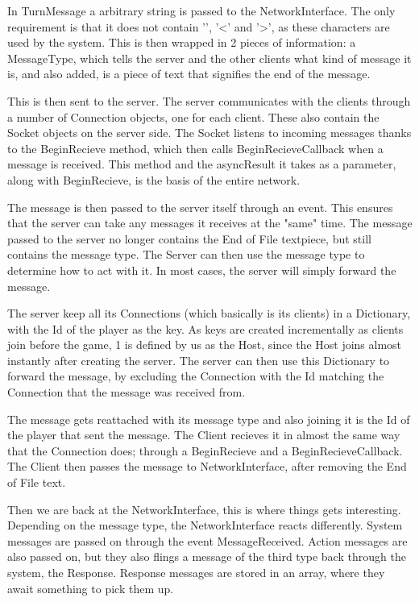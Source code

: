 In TurnMessage a arbitrary string is passed to the NetworkInterface.
The only requirement is that it does not contain '\textbar', '\textless' and '\textgreater', as these characters are used by the system.
This is then wrapped in 2 pieces of information: a MessageType, which tells the server and the other clients what kind of message it is, and also added, is a piece of text that signifies the end of the message.

This is then sent to the server. The server communicates with the clients through a number of Connection objects, one for each client. 
These also contain the Socket objects on the server side. The Socket listens to incoming messages thanks to the BeginRecieve method, which then calls BeginRecieveCallback when a message is received. 
This method and the asyncResult it takes as a parameter, along with BeginRecieve, is the basis of the entire network.

The message is then passed to the server itself through an event.
This ensures that the server can take any messages it receives at the "same" time. 
The message passed to the server no longer contains the End of File textpiece, but still contains the message type.
The Server can then use the message type to determine how to act with it. In most cases, the server will simply forward the message.

The server keep all its Connections (which basically is its clients) in a Dictionary, with the Id of the player as the key. 
As keys are created incrementally as clients join before the game, 1 is defined by us as the Host, since the Host joins almost instantly after creating the server.
The server can then use this Dictionary to forward the message, by excluding the Connection with the Id matching the Connection that the message was received from.

The message gets reattached with its message type and also joining it is the Id of the player that sent the message. 
The Client recieves it in almost the same way that the Connection does; through a BeginRecieve and a BeginRecieveCallback.
The Client then passes the message to NetworkInterface, after removing the End of File text.

Then we are back at the NetworkInterface, this is where things gets interesting. 
Depending on the message type, the NetworkInterface reacts differently.
System messages are passed on through the event MessageReceived.
Action messages are also passed on, but they also flings a message of the third type back through the system, the Response.
Response messages are stored in an array, where they await something to pick them up.

